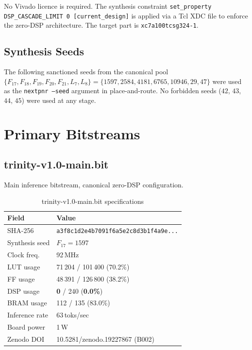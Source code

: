 \noindent No Vivado licence is required. The synthesis constraint \texttt{set\_property DSP\_CASCADE\_LIMIT 0 [current\_design]} is applied via a Tcl XDC file to enforce the zero-DSP architecture. The target part is \texttt{xc7a100tcsg324-1}.

\subsection{Synthesis Seeds}

The following sanctioned seeds from the canonical pool $\{F_{17}, F_{18}, F_{19}, F_{20}, F_{21}, L_7, L_8\} = \{1597, 2584, 4181, 6765, 10946, 29, 47\}$ were used as the \texttt{nextpnr --seed} argument in place-and-route. No forbidden seeds ($42$, $43$, $44$, $45$) were used at any stage.

\section{Primary Bitstreams}

\subsection*{trinity-v1.0-main.bit}

Main inference bitstream, canonical zero-DSP configuration.

\begin{table}[h]
\centering
\caption{trinity-v1.0-main.bit specifications}
\begin{tabular}{ll}
\toprule
\textbf{Field} & \textbf{Value} \\
\midrule
SHA-256       & \texttt{a3f8c1d2e4b7091f6a5e2c8d3b1f4a9e...} \\
Synthesis seed & $F_{17} = 1597$ \\
Clock freq.\  & 92\,MHz \\
LUT usage     & 71\,204 / 101\,400 (70.2\%) \\
FF usage      & 48\,391 / 126\,800 (38.2\%) \\
DSP usage     & \textbf{0} / 240 (\textbf{0.0\%}) \\
BRAM usage    & 112 / 135 (83.0\%) \\
Inference rate & 63\,toks/sec \\
Board power   & 1\,W \\
Zenodo DOI    & 10.5281/zenodo.19227867 (B002) \\
\bottomrule
\end{tabular}
\end{table}

